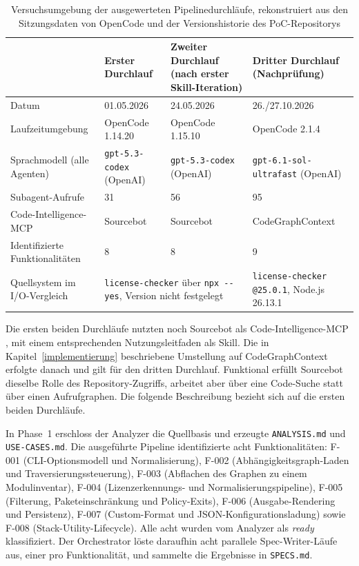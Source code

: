 \begin{table}[H]
\centering
\begin{small}
\begin{tabular}{|p{3.1cm}|p{3.2cm}|p{3.2cm}|p{4.1cm}|}
\hline
 & \textbf{Erster Durchlauf} & \textbf{Zweiter Durchlauf (nach erster Skill-Iteration)} & \textbf{Dritter Durchlauf (Nachprüfung)} \\
\hline
Datum & 01.05.2026 & 24.05.2026 & 26./27.10.2026 \\
\hline
Laufzeitumgebung & OpenCode 1.14.20 & OpenCode 1.15.10 & OpenCode 2.1.4 \\
\hline
Sprachmodell (alle Agenten) & \texttt{gpt-5.3-codex} (OpenAI) & \texttt{gpt-5.3-codex} (OpenAI) & \texttt{gpt-6.1-sol-} \texttt{ultrafast} (OpenAI) \\
\hline
Subagent-Aufrufe & 31 & 56 & 95 \\
\hline
Code-Intelligence-MCP & Sourcebot & Sourcebot & CodeGraphContext \\
\hline
Identifizierte Funktionalitäten & 8 & 8 & 9 \\
\hline
Quellsystem im I/O-Vergleich & \multicolumn{2}{p{6.8cm}|}{\texttt{license-checker} über \texttt{npx -{}-yes}, Version nicht festgelegt} & \texttt{license-checker} \texttt{@25.0.1}, Node.js 26.13.1 \\
\hline
\end{tabular}
\end{small}
\caption{Versuchsumgebung der ausgewerteten Pipelinedurchläufe, rekonstruiert aus den Sitzungsdaten von OpenCode und der Versionshistorie des PoC-Repositorys}
\label{tab:versuchsumgebung}
\end{table}

Die ersten beiden Durchläufe nutzten noch Sourcebot als Code-Intelligence-MCP \parencite{sourcebotdocs}, mit einem entsprechenden Nutzungsleitfaden als Skill. Die in Kapitel~\ref{implementierung} beschriebene Umstellung auf CodeGraphContext erfolgte danach und gilt für den dritten Durchlauf. Funktional erfüllt Sourcebot dieselbe Rolle des Repository-Zugriffs, arbeitet aber über eine Code-Suche statt über einen Aufrufgraphen. Die folgende Beschreibung bezieht sich auf die ersten beiden Durchläufe.

In Phase~1 erschloss der Analyzer die Quellbasis und erzeugte \texttt{ANALYSIS.md} und \texttt{USE-CASES.md}. Die ausgeführte Pipeline identifizierte acht Funktionalitäten: F-001 (CLI-Optionsmodell und Normalisierung), F-002 (Abhängigkeitsgraph-Laden und Traversierungssteuerung), F-003 (Abflachen des Graphen zu einem Modulinventar), F-004 (Lizenzerkennungs- und Normalisierungspipeline), F-005 (Filterung, Paketeinschränkung und Policy-Exits), F-006 (Ausgabe-Rendering und Persistenz), F-007 (Custom-Format und JSON-Konfigurationsladung) sowie F-008 (Stack-Utility-Lifecycle). Alle acht wurden vom Analyzer als \emph{ready} klassifiziert. Der Orchestrator löste daraufhin acht parallele Spec-Writer-Läufe aus, einer pro Funktionalität, und sammelte die Ergebnisse in \texttt{SPECS.md}.

